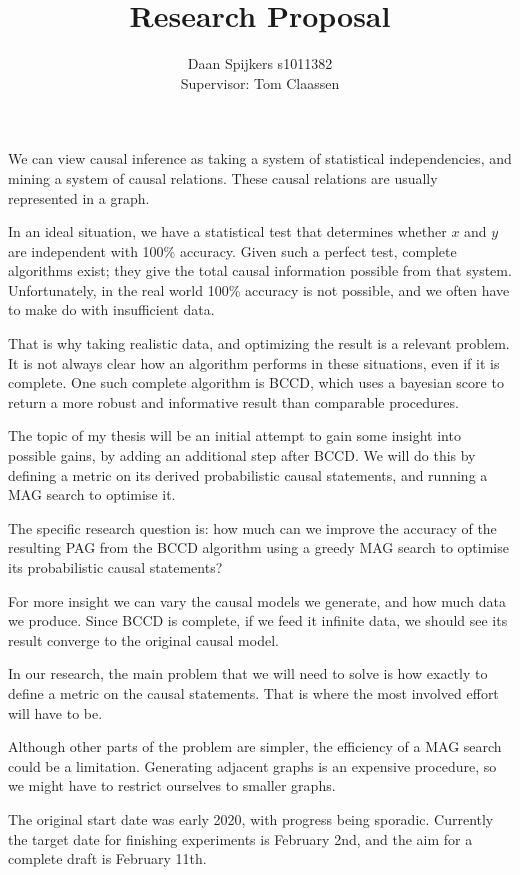 \documentclass{article}
\author{Daan Spijkers s1011382 \\ Supervisor: Tom Claassen}
\title{Research Proposal}
\begin{document}
\maketitle

We can view causal inference as taking a system of statistical
independencies, and mining a system of causal relations. These causal
relations are usually represented in a graph.

In an ideal situation, we have a statistical test that determines
whether $x$ and $y$ are independent with 100\% accuracy. Given such a
perfect test, complete algorithms exist; they give the total causal
information possible from that system. Unfortunately, in the real world
100\% accuracy is not possible, and we often have to make do with
insufficient data.

That is why taking realistic data, and optimizing the result is a relevant
problem. It is not always clear how an algorithm performs in these
situations, even if it is complete. One such complete algorithm is BCCD,
which uses a bayesian score to return a more robust and informative result
than comparable procedures.

The topic of my thesis will be an initial attempt to gain some insight
into possible gains, by adding an additional step after BCCD. We will do
this by defining a metric on its derived probabilistic causal statements,
and running a MAG search to optimise it.

The specific research question is: how much can we improve the accuracy of
the resulting PAG from the BCCD algorithm using a greedy MAG search
to optimise its probabilistic causal statements?

For more insight we can vary the causal models we generate, and how much
data we produce. Since BCCD is complete, if we feed it infinite data, we
should see its result converge to the original causal model.

In our research, the main problem that we will need to solve is how
exactly to define a metric on the causal statements. That is where the most
involved effort will have to be.

Although other parts of the problem are simpler, the efficiency of a MAG
search could be a limitation. Generating adjacent graphs is an
expensive procedure, so we might have to restrict ourselves to smaller
graphs.

The original start date was early 2020, with progress being sporadic.
Currently the target date for finishing experiments is February 2nd, and
the aim for a complete draft is February 11th.
\end{document}
